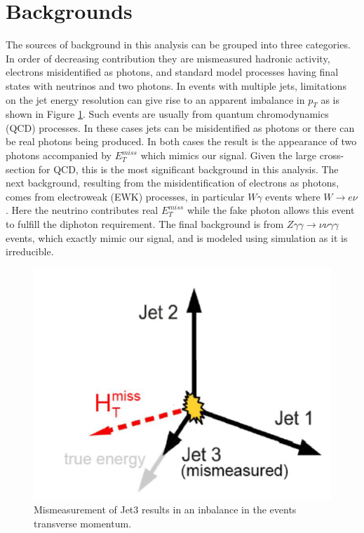 \section{Backgrounds}
The sources of background in this analysis can be grouped into three categories.  In order of decreasing contribution they are mismeasured hadronic activity, electrons misidentified as photons, and standard model processes having final states with neutrinos and two photons.  In events with multiple jets, limitations on the jet energy resolution can give rise to an apparent imbalance in $p_T$ as is shown in Figure \ref{fig:fakemet}.  Such events are usually from quantum chromodynamics (QCD) processes.  In these cases jets can be misidentified as photons or there can be real photons being produced.  In both cases the result is the appearance of two photons accompanied by $E^{miss}_T$ which mimics our signal.  Given the large cross-section for QCD, this is the most significant background in this analysis.  The next background, resulting from the misidentification of electrons as photons, comes from electroweak (EWK) processes, in particular $W\gamma$ events where $W \rightarrow e\nu$.  Here the neutrino contributes real $E^{miss}_T$ while the fake photon allows this event to fulfill the diphoton requirement.  The final background is from $Z\gamma \gamma \rightarrow \nu \nu \gamma \gamma$ events, which exactly mimic our signal, and is modeled using simulation as it is irreducible.

\begin{figure}
	\centering
	\includegraphics[width=0.5\linewidth]{Figures/FakeMET}
	\caption{Mismeasurement of Jet3 results in an inbalance in the events transverse momentum.}
	\label{fig:fakemet}
\end{figure}

